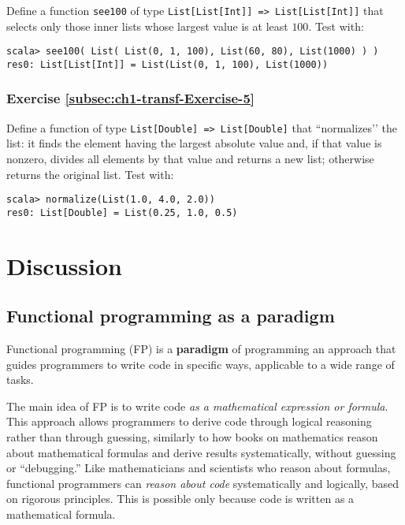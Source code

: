 Define a function \lstinline!see100! of type \texttt{}\lstinline!List[List[Int]] => List[List[Int]]!
that selects only those inner lists whose largest value is at least
$100$. Test with:
\begin{lstlisting}
scala> see100( List( List(0, 1, 100), List(60, 80), List(1000) ) )
res0: List[List[Int]] = List(List(0, 1, 100), List(1000))
\end{lstlisting}


\subsubsection{Exercise \label{subsec:ch1-transf-Exercise-5}\ref{subsec:ch1-transf-Exercise-5}}

Define a function of type \texttt{}\lstinline!List[Double] => List[Double]!
that \textsf{``}normalizes\textsf{'}' the list: it finds the element having the largest
absolute value and, if that value is nonzero, divides all elements
by that value and returns a new list; otherwise returns the original
list. Test with:
\begin{lstlisting}
scala> normalize(List(1.0, 4.0, 2.0))
res0: List[Double] = List(0.25, 1.0, 0.5)
\end{lstlisting}


\section{Discussion}

\subsection{Functional programming as a paradigm}

Functional programming (FP) is a \textbf{paradigm}
of programming \textemdash{} an approach that guides programmers to
write code in specific ways, applicable to a wide range of tasks.

The main idea of FP is to write code \emph{as a mathematical expression
or formula}. This approach allows programmers to derive code through
logical reasoning rather than through guessing, similarly to how books
on mathematics reason about mathematical formulas and derive results
systematically, without guessing or \textsf{``}debugging.\textsf{''} Like mathematicians
and scientists who reason about formulas, functional programmers can
\emph{reason about code} systematically and logically, based on rigorous
principles. This is possible only because code is written as a mathematical
formula.

